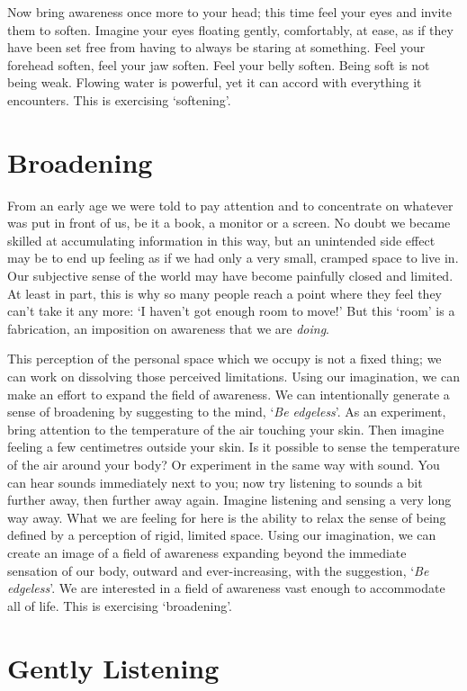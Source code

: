 Now bring awareness once more to your head; this time feel your eyes and
invite them to soften. Imagine your eyes floating gently, comfortably,
at ease, as if they have been set free from having to always be staring
at something. Feel your forehead soften, feel your jaw soften. Feel your
belly soften. Being soft is not being weak. Flowing water is powerful,
yet it can accord with everything it encounters. This is exercising
`softening'.

\section{Broadening}

From an early age we were told to pay attention and to concentrate on
whatever was put in front of us, be it a book, a monitor or a screen. No
doubt we became skilled at accumulating information in this way, but an
unintended side effect may be to end up feeling as if we had only a very
small, cramped space to live in. Our subjective sense of the world may
have become painfully closed and limited. At least in part, this is why
so many people reach a point where they feel they can't take it any
more: `I haven't got enough room to move!' But this `room' is a
fabrication, an imposition on awareness that we are \emph{doing}.

This perception of the personal space which we occupy is not a fixed
thing; we can work on dissolving those perceived limitations. Using our
imagination, we can make an effort to expand the field of awareness. We can intentionally
generate a sense of broadening by suggesting to the mind, `\emph{Be
edgeless}'. As an experiment, bring attention to the temperature of the
air touching your skin. Then imagine feeling a few centimetres outside your
skin. Is it possible to sense the temperature of the air around your
body? Or
experiment in the same way with sound. You can hear sounds immediately
next to you; now try listening to sounds a bit further away, then
further away again. Imagine listening and sensing a very long way away.
What we are feeling for here is the ability to relax the sense of being
defined by a perception of rigid, limited space. Using our imagination,
we can create an image of a field of awareness expanding beyond the
immediate sensation of our body, outward and ever-increasing, with the
suggestion, `\emph{Be edgeless}'.
We are interested in a field of awareness vast enough to
accommodate all of life. This is exercising `broadening'.

\section{Gently Listening}

